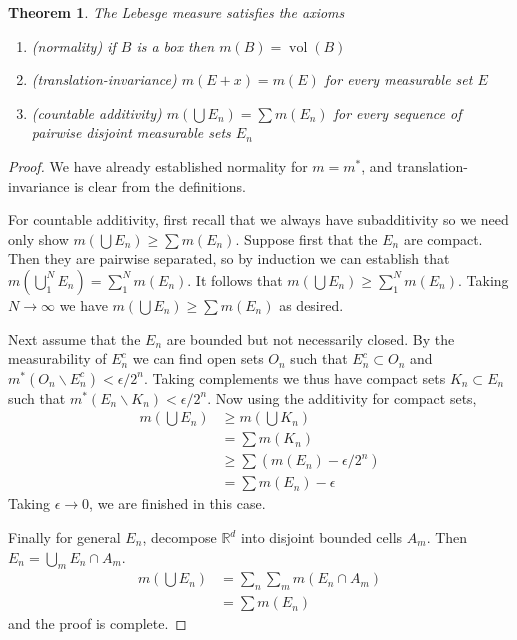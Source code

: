 \documentclass[11pt,oneside]{amsbook}
\renewcommand{\setminus}{\smallsetminus}
\newcommand{\RR}{\mathbb R}
\DeclareMathOperator{\vol}{vol}
\theoremstyle{definition}
\theoremstyle{plain}
\newtheorem{thm}{Theorem}[section]
\theoremstyle{definition}
\theoremstyle{remark}
\numberwithin{equation}{section}
\numberwithin{figure}{section}
\begin{document}
\begin{thm}
  The Lebesge measure satisfies the axioms
  \begin{enumerate}
  \item (normality) if $B$ is a box then $m(B)=\vol(B)$
  \item (translation-invariance) $m(E+x)=m(E)$ for every measurable set $E$
  \item (countable additivity) $m(\bigcup E_n)=\sum m(E_n)$ for every sequence of pairwise disjoint measurable sets $E_n$
  \end{enumerate}
\end{thm}

\begin{proof}
  We have already established normality for $m=m^*$, and translation-invariance is clear from the definitions.

  For countable additivity, first recall that we always have subadditivity so we need only show $m(\bigcup E_n)\geq\sum m(E_n)$. Suppose first that the $E_n$ are compact. Then they are pairwise separated, so by induction we can establish that $m(\bigcup_1^NE_n)=\sum_1^Nm(E_n)$. It follows that $m(\bigcup E_n)\geq\sum_1^Nm(E_n)$. Taking $N\to\infty$ we have $m(\bigcup E_n)\geq\sum m(E_n)$ as desired.

  Next assume that the $E_n$ are bounded but not necessarily closed. By the measurability of $E_n^c$ we can find open sets $O_n$ such that $E_n^c\subset O_n$ and $m^*(O_n\setminus E_n^c)<\epsilon/2^n$. Taking complements we thus have compact sets $K_n\subset E_n$ such that $m^*(E_n\setminus K_n)<\epsilon/2^n$. Now using the additivity for compact sets,
  \begin{align*}
    m(\bigcup E_n)&\geq m(\bigcup K_n)\\
                  &=\sum m(K_n)\\
                  &\geq\sum(m(E_n)-\epsilon/2^n)\\
                  &=\sum m(E_n)-\epsilon
  \end{align*}
  Taking $\epsilon\to0$, we are finished in this case.

  Finally for general $E_n$, decompose $\RR^d$ into disjoint bounded cells $A_m$. Then $E_n=\bigcup_mE_n\cap A_m$.
  \begin{align*}
    m(\bigcup E_n)&=\sum_n\sum_mm(E_n\cap A_m)\\
                  &=\sum m(E_n)
  \end{align*}
  and the proof is complete.
\end{proof}
\end{document}
